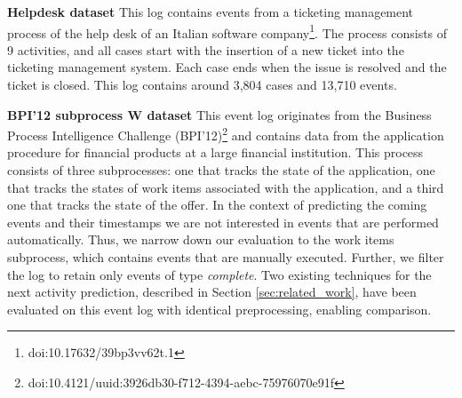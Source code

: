 \documentclass[runningheads,a4paper]{llncs}
\begin{document}
\medskip\noindent\textbf{Helpdesk dataset}
This log contains events from a ticketing management process of the help desk of an Italian software company\footnote{doi:10.17632/39bp3vv62t.1}. The process consists of 9 activities, and all cases start with the insertion of a new ticket into the ticketing management system. Each case ends when the issue is resolved and the ticket is closed. This log contains around 3,804 cases and 13,710 events.

\medskip\noindent\textbf{BPI'12 subprocess W dataset}
This event log originates from the Business Process Intelligence Challenge (BPI'12)\footnote{doi:10.4121/uuid:3926db30-f712-4394-aebc-75976070e91f} and contains data from the application procedure for financial products at a large financial institution. This process consists of three subprocesses: one that tracks the state of the application, one that tracks the states of work items associated with the application, and a third one that tracks the state of the offer. In the context of predicting the coming events and their timestamps we are not interested in events that are performed automatically. Thus, we narrow down our evaluation to the work items subprocess, which contains events that are manually executed. Further, we filter the log to retain only events of type \emph{complete}. Two existing techniques \cite{Breuker2016,Evermann2016} for the next activity prediction, described in Section \ref{sec:related_work}, have been evaluated on this event log with identical preprocessing, enabling comparison. 
\end{document}
